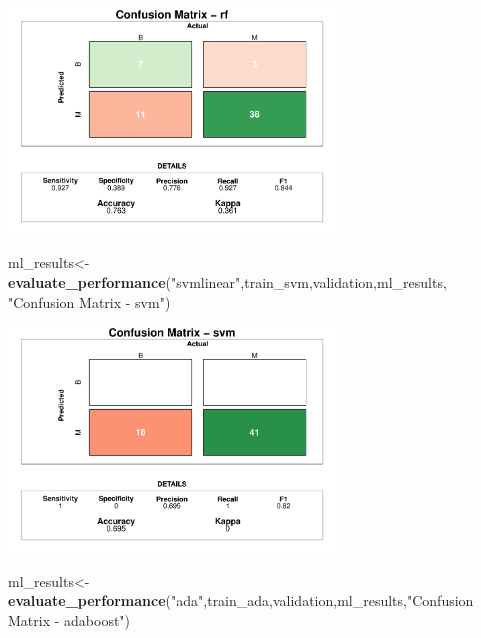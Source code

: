 \documentclass[]{article}
\newenvironment{Shaded}{\begin{snugshade}}{\end{snugshade}}
\newcommand{\KeywordTok}[1]{\textcolor[rgb]{0.13,0.29,0.53}{\textbf{#1}}}
\newcommand{\NormalTok}[1]{#1}
\newcommand{\StringTok}[1]{\textcolor[rgb]{0.31,0.60,0.02}{#1}}
\begin{document}
\begin{center}
\includegraphics[width=0.65\textwidth]{LiverDisease_files/figure-latex/unnamed-chunk-45-1.pdf}
\end{center}


\begin{Shaded}
\begin{Highlighting}[]
\NormalTok{ml_results<-}\KeywordTok{evaluate_performance}\NormalTok{(}\StringTok{"svmlinear"}\NormalTok{,train_svm,validation,ml_results, }\StringTok{"Confusion Matrix - svm"}\NormalTok{)}
\end{Highlighting}
\end{Shaded}

\begin{center}
\includegraphics[width=0.65\textwidth]{LiverDisease_files/figure-latex/unnamed-chunk-46-1.pdf}
\end{center}


\begin{Shaded}
\begin{Highlighting}[]
\NormalTok{ml_results<-}\KeywordTok{evaluate_performance}\NormalTok{(}\StringTok{"ada"}\NormalTok{,train_ada,validation,ml_results,}\StringTok{"Confusion Matrix - adaboost"}\NormalTok{)}
\end{Highlighting}
\end{Shaded}
\end{document}
